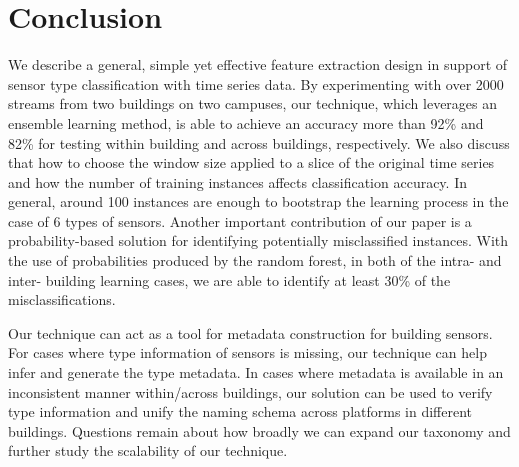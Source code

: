 \section{Conclusion}
We describe a general, simple yet effective feature extraction design in support of sensor type classification with time series data. By experimenting 
with over 2000 streams from two buildings on two campuses, our technique, which leverages an ensemble learning method, is able to achieve an accuracy more than 
92\% and 82\% for testing within building and across buildings, respectively. We also discuss that how to choose the window size applied 
to a slice of the original time series and how the number of training instances affects classification accuracy. In general, around 100 instances are 
enough to bootstrap the learning process in the case of 6 types of sensors. Another important contribution of our paper is a probability-based solution for identifying 
potentially misclassified instances. With the use of probabilities produced by the random forest, in both of the intra- and inter- building learning cases, we are able 
to identify at least 30\% of the misclassifications.%

Our technique can act as a tool for metadata construction for building sensors. For cases where type information of sensors is missing, our technique can 
help infer and generate the type metadata. In cases where metadata is available in an inconsistent manner within/across buildings, our solution 
can be used to verify type information and unify the naming schema across platforms in different buildings. Questions remain about how broadly we 
can expand our taxonomy and further study the scalability of our technique.

